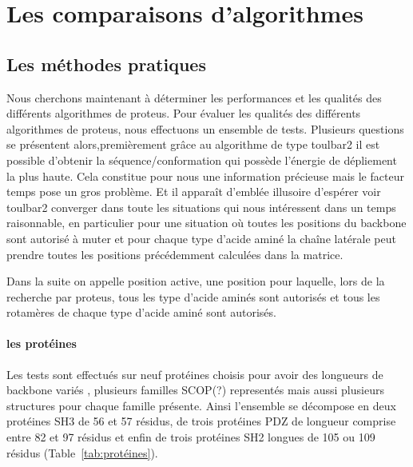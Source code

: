 \chapter{Les comparaisons d'algorithmes}
\label{chap:resultats_comparaisons}


\section{Les méthodes pratiques} 

Nous cherchons maintenant à déterminer les performances et les qualités des différents algorithmes de proteus.
Pour évaluer les qualités des différents algorithmes de proteus, nous effectuons un ensemble de tests. 
Plusieurs questions se présentent alors,premièrement grâce au algorithme de type toulbar2 il est possible d'obtenir la séquence/conformation qui possède l'énergie de dépliement la plus haute. Cela constitue pour nous une information précieuse mais le facteur temps pose un gros problème. Et il apparaît d'emblée illusoire d'espérer voir toulbar2 converger dans toute les situations qui nous intéressent dans un temps raisonnable, en particulier pour une situation où  toutes les positions du  backbone sont autorisé à muter et pour chaque type d'acide aminé la chaîne latérale peut prendre toutes les positions précédemment calculées dans la matrice. 


Dans la suite on appelle position active, une position pour laquelle, lors de la recherche par proteus, tous les type d'acide aminés sont autorisés et tous les rotamères de chaque type d'acide aminé sont autorisés.


\subsubsection{les protéines}
 
Les tests sont effectués sur neuf protéines choisis pour avoir des longueurs de backbone variés , plusieurs familles SCOP(?) representés mais aussi plusieurs structures pour chaque famille présente. Ainsi l'ensemble se décompose en deux protéines SH3 de 56 et 57 résidus, de trois protéines PDZ de longueur comprise entre 82 et 97 résidus  et enfin de trois protéines SH2  longues de 105 ou 109 résidus (Table~\ref{tab:protéines}).  


